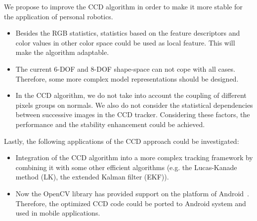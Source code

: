 We propose to improve the CCD algorithm in order to make it
more stable for the application of personal robotics.
\begin{itemize}
\item Besides the RGB statistics, statistics based on the feature
  descriptors and color values in other color space could be used as
  local feature. This will make the algorithm adaptable.
\item The current 6-DOF and 8-DOF shape-space can not cope with all
  cases.%
Therefore, some more complex model representations should be designed.
\item In the CCD algorithm, we do not take into account
  the coupling of different pixels groups on normals. We also
  do not consider the statistical dependencies between successive
  images in the CCD tracker. Considering these factors, the performance and
  the stability enhancement could be achieved.
\end{itemize}

Lastly, the following applications of the CCD approach could be investigated:
\begin{itemize}
\item Integration of the CCD algorithm into a more complex
  tracking framework by combining it with some other efficient
  algorithms (e.g. the Lucas-Kanade method (LK), the extended Kalman
  filter (EKF)).
\item Now the OpenCV library has provided support on the platform of
  Android~\cite{android}. Therefore, the optimized CCD code could be ported to
  Android system and used in mobile applications.
\end{itemize}
